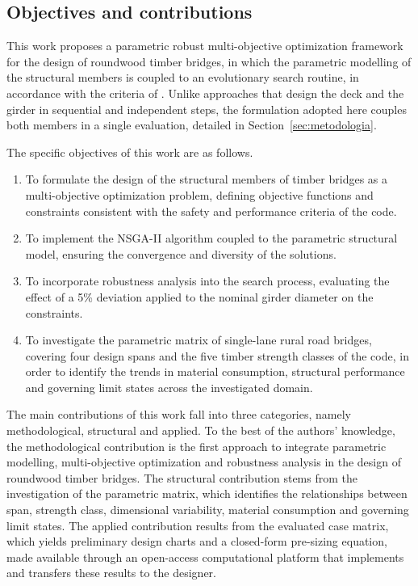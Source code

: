 \subsection{Objectives and contributions}\label{sec:objetivos_contribuicoes}

This work proposes a parametric robust multi-objective optimization framework for the design of roundwood timber bridges, in which the parametric modelling of the structural members is coupled to an evolutionary search routine, in accordance with the criteria of \textcite{NBR7190-1:2022}.
Unlike approaches that design the deck and the girder in sequential and independent steps, the formulation adopted here couples both members in a single evaluation, detailed in Section~\ref{sec:metodologia}.

The specific objectives of this work are as follows.
\begin{enumerate}[label=(\roman*)]
    \item To formulate the design of the structural members of timber bridges as a multi-objective optimization problem, defining objective functions and constraints consistent with the safety and performance criteria of the code.
    \item To implement the NSGA-II algorithm coupled to the parametric structural model, ensuring the convergence and diversity of the solutions.
    \item To incorporate robustness analysis into the search process, evaluating the effect of a 5\% deviation applied to the nominal girder diameter on the constraints.
    \item To investigate the parametric matrix of single-lane rural road bridges, covering four design spans and the five timber strength classes of the code, in order to identify the trends in material consumption, structural performance and governing limit states across the investigated domain.
\end{enumerate}

The main contributions of this work fall into three categories, namely methodological, structural and applied. To the best of the authors' knowledge, the methodological contribution is the first approach to integrate parametric modelling, multi-objective optimization and robustness analysis in the design of roundwood timber bridges. The structural contribution stems from the investigation of the parametric matrix, which identifies the relationships between span, strength class, dimensional variability, material consumption and governing limit states. The applied contribution results from the evaluated case matrix, which yields preliminary design charts and a closed-form pre-sizing equation, made available through an open-access computational platform that implements and transfers these results to the designer.
